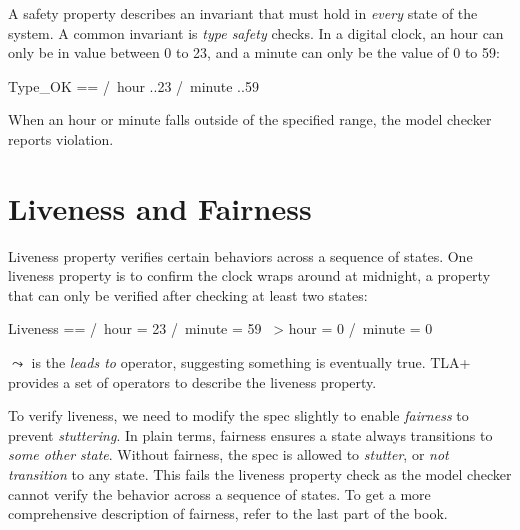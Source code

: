 A safety property describes an invariant that must hold in \textit{every} state
of the system. A common invariant is \textit{type safety} checks. In a digital
clock, an hour can only be in value between 0 to 23, and a minute can only be the value
of 0 to 59:\newline

\begin{tla}
    Type_OK == 
        /\ hour ..23
        /\ minute ..59
\end{tla}
\begin{tlatex}
%
%
%
\end{tlatex}
\newline

When an hour or minute falls outside of the specified range, the model checker 
reports violation.

\section{Liveness and Fairness}

Liveness property verifies certain behaviors across a sequence of states. One
liveness property is to confirm the clock wraps around at midnight, a property
that can only be verified after checking at least two states: \newline

\begin{tla}
    Liveness ==
        /\ hour = 23 /\ minute = 59 ~> hour = 0 /\ minute = 0
\end{tla}
\begin{tlatex}
%
\end{tlatex}
\newline

$\leadsto$ is the \textit{leads to} operator, suggesting something is eventually
true. TLA+ provides a set of operators to describe the liveness property.\newline 

To verify liveness, we need to modify the spec slightly to enable
\textit{fairness} to prevent \textit{stuttering}. In plain terms, fairness
ensures a state always transitions to \textit{some other state}. Without fairness, the spec is allowed to \textit{stutter}, or \textit{not transition} to any state. This fails the liveness property check as the model checker cannot verify the behavior across a sequence of states. To get a more 
comprehensive description of fairness, refer to the last part of the
book.\newline

